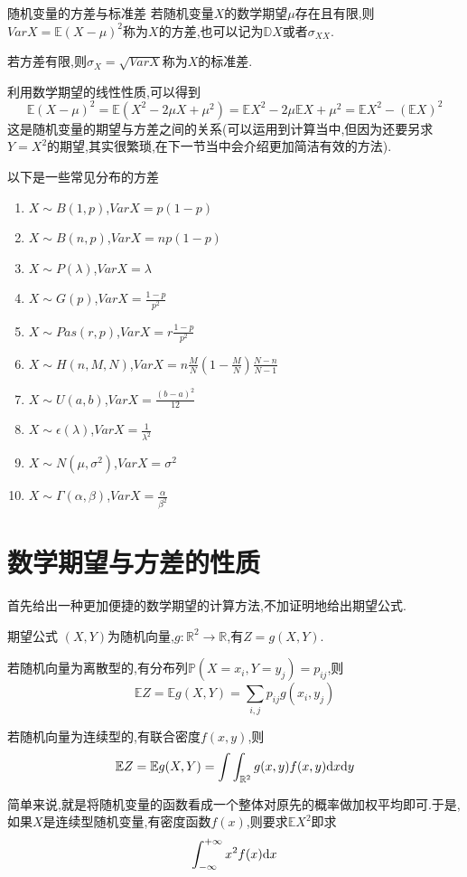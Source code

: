 \documentclass[lang=cn,10pt]{elegantbook}
\begin{document}
\begin{definition}{随机变量的方差与标准差}{}
    若随机变量$X$的数学期望$\mu$存在且有限,则$Var X=\mathbb{E}(X-\mu)^2$称为$X$的方差,也可以记为$\mathbb{D}X$或者$\sigma_{XX}$.

    若方差有限,则$\sigma_X=\sqrt{VarX}$称为$X$的标准差.
\end{definition}
利用数学期望的线性性质,可以得到
$$\mathbb{E}(X-\mu)^2=\mathbb{E}(X^2-2\mu X+\mu^2)=\mathbb{E}X^2-2\mu\mathbb{E}X+\mu^2=\mathbb{E}X^2-(\mathbb{E}X)^2$$
这是随机变量的期望与方差之间的关系(可以运用到计算当中,但因为还要另求$Y=X^2$的期望,其实很繁琐,在下一节当中会介绍更加简洁有效的方法).

以下是一些常见分布的方差
\begin{enumerate}
    \item $X\sim B(1,p)$,$Var X=p(1-p)$
    \item $X\sim B(n,p)$,$Var X=np(1-p)$
    \item $X\sim P(\lambda)$,$Var X=\lambda$
    \item $X\sim G(p)$,$Var X=\frac{1-p}{p^2}$
    \item $X\sim Pas(r,p)$,$Var X=r\frac{1-p}{p^2}$
    \item $X\sim H(n,M,N)$,$Var X=n\frac{M}{N}\left(1-\frac{M}{N}\right)\frac{N-n}{N-1}$
    \item $X\sim U(a,b)$,$Var X=\frac{(b-a)^2}{12}$
    \item $X\sim \epsilon(\lambda)$,$Var X=\frac{1}{\lambda^2}$
    \item $X\sim N(\mu,\sigma^2)$,$Var X=\sigma^2$
    \item $X\sim \Gamma(\alpha,\beta)$,$Var X=\frac{\alpha}{\beta^2}$
\end{enumerate}
\section{数学期望与方差的性质}
首先给出一种更加便捷的数学期望的计算方法,不加证明地给出期望公式.
\begin{theorem}{期望公式}
    $(X,Y)$为随机向量,$g:\mathbb{R}^2\to \mathbb{R}$,有$Z=g(X,Y)$.

    若随机向量为离散型的,有分布列$\mathbb{P}(X=x_i,Y=y_j)=p_{ij}$,则 
    $$\mathbb{E}Z=\mathbb{E}g(X,Y)=\sum_{i,j}p_{ij}g(x_i,y_j)$$

    若随机向量为连续型的,有联合密度$f(x,y)$,则
    $$\mathbb{E}Z=\mathbb{E}g(X,Y)=\int\int_{\mathbb{R}^2}g(x,y)f(x,y){\rm d}x{\rm d}y$$
\end{theorem}
简单来说,就是将随机变量的函数看成一个整体对原先的概率做加权平均即可.于是,如果$X$是连续型随机变量,有密度函数$f(x)$,则要求$\mathbb{E}X^2$即求
$$\int_{-\infty}^{+\infty}x^2f(x){\rm d}x$$
\end{document}
